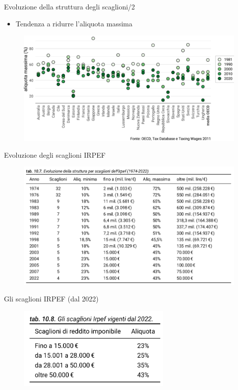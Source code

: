 \documentclass[11pt]{beamer}
\newcommand\€{\,\text{€}}
\begin{document}
\begin{frame}{Evoluzione della struttura degli scaglioni/2}
\begin{itemize}
\item Tendenza a ridurre l'aliquota massima
\end{itemize}

\begin{figure}
\centering
\includegraphics[width=\linewidth]{./figure/top-rates-OCSE-color.pdf}
\end{figure}
\end{frame}

\begin{frame}{Evoluzione degli scaglioni IRPEF}
\begin{figure}
\centering
\includegraphics[width=\linewidth]{./figure/evoluzione-scaglioni-IRPEF.png}
\end{figure}
\end{frame}


\begin{frame}{Gli scaglioni IRPEF (dal 2022)}
\begin{figure}
\centering
\includegraphics[height=4cm]{./figure/scaglioni-IRPEF-2022.png}
\end{figure}
\end{frame}
\end{document}
